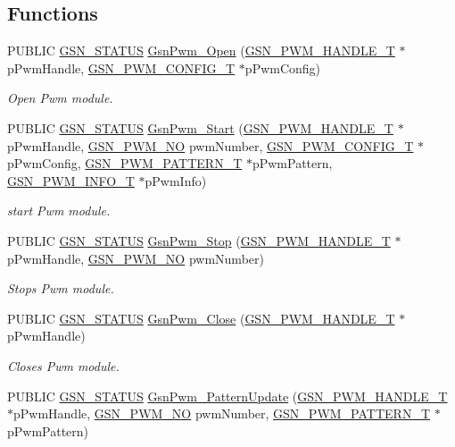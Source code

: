 \subsection*{Functions}
\begin{DoxyCompactItemize}
\item 
PUBLIC \hyperlink{a00660_gada5951904ac6110b1fa95e51a9ddc217}{GSN\_\-STATUS} \hyperlink{a00650_gaf4c38119e4c204818801ffb1b4e2c6b6}{GsnPwm\_\-Open} (\hyperlink{a00182}{GSN\_\-PWM\_\-HANDLE\_\-T} $\ast$pPwmHandle, \hyperlink{a00181}{GSN\_\-PWM\_\-CONFIG\_\-T} $\ast$pPwmConfig)
\begin{DoxyCompactList}\small\item\em Open Pwm module. \end{DoxyCompactList}\item 
PUBLIC \hyperlink{a00660_gada5951904ac6110b1fa95e51a9ddc217}{GSN\_\-STATUS} \hyperlink{a00650_gaa394019a88d51b5f716cabf35bc5e6c8}{GsnPwm\_\-Start} (\hyperlink{a00182}{GSN\_\-PWM\_\-HANDLE\_\-T} $\ast$pPwmHandle, \hyperlink{a00650_ga9afe1c7d571460ff2f6780bef6b433df}{GSN\_\-PWM\_\-NO} pwmNumber, \hyperlink{a00181}{GSN\_\-PWM\_\-CONFIG\_\-T} $\ast$pPwmConfig, \hyperlink{a00183}{GSN\_\-PWM\_\-PATTERN\_\-T} $\ast$pPwmPattern, \hyperlink{a00454}{GSN\_\-PWM\_\-INFO\_\-T} $\ast$pPwmInfo)
\begin{DoxyCompactList}\small\item\em start Pwm module. \end{DoxyCompactList}\item 
PUBLIC \hyperlink{a00660_gada5951904ac6110b1fa95e51a9ddc217}{GSN\_\-STATUS} \hyperlink{a00650_gae88f3b2ecf7fc90d29edb3176435af5a}{GsnPwm\_\-Stop} (\hyperlink{a00182}{GSN\_\-PWM\_\-HANDLE\_\-T} $\ast$pPwmHandle, \hyperlink{a00650_ga9afe1c7d571460ff2f6780bef6b433df}{GSN\_\-PWM\_\-NO} pwmNumber)
\begin{DoxyCompactList}\small\item\em Stops Pwm module. \end{DoxyCompactList}\item 
PUBLIC \hyperlink{a00660_gada5951904ac6110b1fa95e51a9ddc217}{GSN\_\-STATUS} \hyperlink{a00650_gad8fcb2f6f84a57099c5ca178dafa7286}{GsnPwm\_\-Close} (\hyperlink{a00182}{GSN\_\-PWM\_\-HANDLE\_\-T} $\ast$pPwmHandle)
\begin{DoxyCompactList}\small\item\em Closes Pwm module. \end{DoxyCompactList}\item 
PUBLIC \hyperlink{a00660_gada5951904ac6110b1fa95e51a9ddc217}{GSN\_\-STATUS} \hyperlink{a00650_gafebd1cc305dbd45194b7474691752be4}{GsnPwm\_\-PatternUpdate} (\hyperlink{a00182}{GSN\_\-PWM\_\-HANDLE\_\-T} $\ast$pPwmHandle, \hyperlink{a00650_ga9afe1c7d571460ff2f6780bef6b433df}{GSN\_\-PWM\_\-NO} pwmNumber, \hyperlink{a00183}{GSN\_\-PWM\_\-PATTERN\_\-T} $\ast$pPwmPattern)

\end{DoxyCompactItemize}
